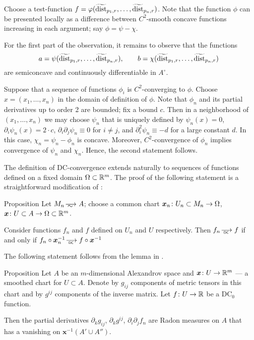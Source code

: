 Choose a test-function $f=\varphi(\widetilde{\operatorname{\rm dist}}_{p_1,r},\dots,\widetilde{\operatorname{\rm dist}}_{p_n,r})$.
Note that the function $\phi$ can be presented locally as a difference between $C^2$-smooth concave functions increasing in each argument; say $\phi=\psi-\chi$.

For the first part of the observation, it remains to observe that the functions \[a=\psi(\widetilde\dist_{p_1,r},\zz\dots,\widetilde\dist_{p_n,r}),\qquad b=\chi(\widetilde\dist_{p_1,r},\zz\dots,\widetilde\dist_{p_n,r})\]
are semiconcave and continuously differentiable in $A^\circ$.

Suppose that a sequence of functions $\phi_i$ is $C^2$-converging to $\phi$.
Choose $x=(x_1,\dots,x_n)$ in the domain of definition of $\phi$.
Note that $\phi_n$ and its partial derivatives up to order 2 are bounded;
fix a bound $c$.
Then in a neighborhood of $(x_1,\dots,x_n)$ we may choose $\psi_n$ that is uniquely defined by $\psi_n(x)=0$, $\partial_i\psi_n(x)=2\cdot c$, $\partial_i\partial_j\psi_n\equiv 0$ for $i\ne j$, and $\partial_i^2\psi_n\equiv -d$ for a large constant $d$. 
In this case, $\chi_n=\psi_n-\phi_n$ is concave.
Moreover, $C^2$-convergence of $\phi_n$ implies convergence of $\psi_n$ and $\chi_n$.
Hence, the second statement follows.
\qeds

The definition of DC-convergence extends naturally to sequences of functions defined on a fixed domain $\Omega\subset \mathbb{R}^m$.
The proof of the following statement is a straightforward modification of \cite[Section 3]{PerDC}:

\begin{thm}{Proposition}\label{prop:DC-conv}
Let $M_n\smooths{} A$;
choose a common chart $\bm{x}_n\:U_n\zz\subset M_n\to \Omega$, $\bm{x}\:U\subset A\zz\to \Omega\subset \RR^m$.

Consider functions $f_n$ and $f$ defined on $U_n$ and $U$ respectively.
Then $f_n\DCto f$ if and only if $f_n\circ \bm{x}_n^{-1}\DCto f\circ \bm{x}^{-1}$
\end{thm}

The following statement follows from the lemma in \cite[Section 3]{PerDC}.

\begin{thm}{Proposition}\label{metricBV+}
Let $A$ be an $m$-dimensional Alexandrov space and $\bm{x}\colon U\to \mathbb{R}^m$ --- a smoothed chart for $U\subset A$.
Denote by $g_{ij}$ components of metric tensors in this chart
and by $g^{ij}$ components of the inverse matrix. 
Let $f\colon U\to \mathbb{R}$ be a DC$_0$ function.

Then the partial derivatives $\partial_k g_{ij}$, $\partial_k g^{ij}$, $\partial_i\partial_jf_n$ are Radon measures on $A$ that has a vanishing on $\bm{x}^{-1}(A'\cup A'')$.
\end{thm}



